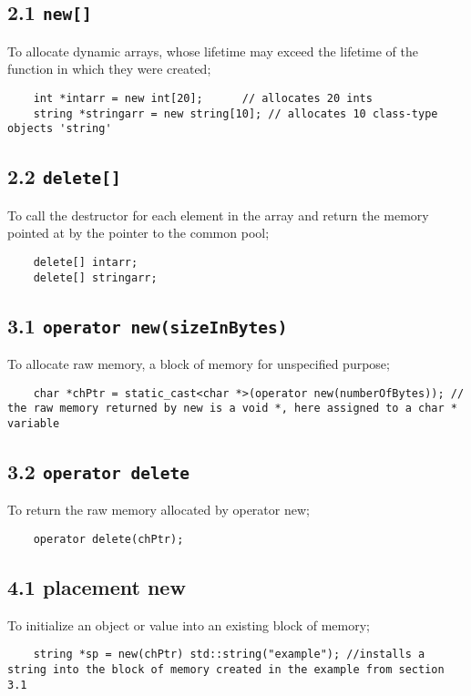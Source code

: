 \documentclass[11pt]{article}
\begin{document}
\subsection*{2.1 \texttt{new[]}}
To allocate dynamic arrays, whose lifetime may exceed the lifetime of the function in which they were created;

\begin{lstlisting}
	int *intarr = new int[20];		// allocates 20 ints
	string *stringarr = new string[10];	// allocates 10 class-type objects 'string'
\end{lstlisting}

\subsection*{2.2 \texttt{delete[]}}
To call the destructor for each element in the array and return the memory pointed at by the pointer to the common pool;
\begin{lstlisting}
	delete[] intarr;
	delete[] stringarr;
\end{lstlisting}

\subsection*{3.1 \texttt{operator new(sizeInBytes)}}
To allocate raw memory, a block of memory for unspecified purpose;
\begin{lstlisting}	
	char *chPtr = static_cast<char *>(operator new(numberOfBytes)); // the raw memory returned by new is a void *, here assigned to a char * variable
\end{lstlisting}

\subsection*{3.2 \texttt{operator delete}}
To return the raw memory allocated by operator new;
\begin{lstlisting}
	operator delete(chPtr);
\end{lstlisting}

\subsection*{4.1 placement new}
To initialize an object or value into an existing block of memory;
\begin{lstlisting}
	string *sp = new(chPtr) std::string("example");	//installs a string into the block of memory created in the example from section 3.1
\end{lstlisting}
\end{document}
